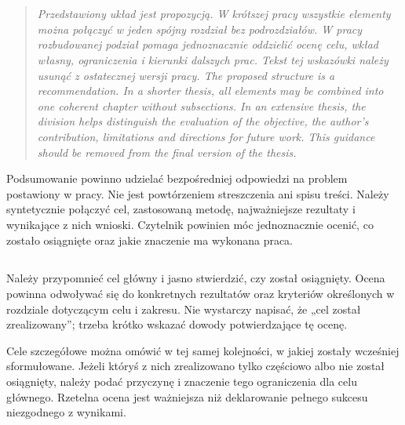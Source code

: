 \chapter{}


\begin{quote}
\itshape
\ploren
  {Przedstawiony układ jest propozycją. W krótszej pracy wszystkie elementy można połączyć w jeden spójny rozdział bez podrozdziałów. W pracy rozbudowanej podział pomaga jednoznacznie oddzielić ocenę celu, wkład własny, ograniczenia i kierunki dalszych prac. Tekst tej wskazówki należy usunąć z ostatecznej wersji pracy.}
  {The proposed structure is a recommendation. In a shorter thesis, all elements may be combined into one coherent chapter without subsections. In an extensive thesis, the division helps distinguish the evaluation of the objective, the author's contribution, limitations and directions for future work. This guidance should be removed from the final version of the thesis.}
\end{quote}

Podsumowanie powinno udzielać bezpośredniej odpowiedzi na problem postawiony w pracy. Nie jest powtórzeniem streszczenia ani spisu treści. Należy syntetycznie połączyć cel, zastosowaną metodę, najważniejsze rezultaty i wynikające z nich wnioski. Czytelnik powinien móc jednoznacznie ocenić, co zostało osiągnięte oraz jakie znaczenie ma wykonana praca.

\section{}

Należy przypomnieć cel główny i jasno stwierdzić, czy został osiągnięty. Ocena powinna odwoływać się do konkretnych rezultatów oraz kryteriów określonych w rozdziale dotyczącym celu i zakresu. Nie wystarczy napisać, że „cel został zrealizowany”; trzeba krótko wskazać dowody potwierdzające tę ocenę.

Cele szczegółowe można omówić w tej samej kolejności, w jakiej zostały wcześniej sformułowane. Jeżeli któryś z nich zrealizowano tylko częściowo albo nie został osiągnięty, należy podać przyczynę i znaczenie tego ograniczenia dla celu głównego. Rzetelna ocena jest ważniejsza niż deklarowanie pełnego sukcesu niezgodnego z wynikami.

